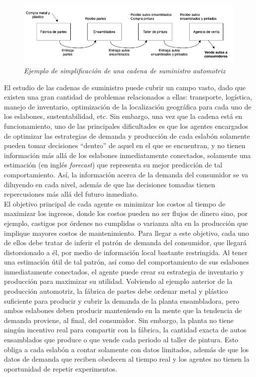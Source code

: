 \begin{figure}[ht]
\caption{\textit{Ejemplo de simplificaci\'on de una cadena de suministro automotriz}}
\label{automotriz}
\includegraphics[width=15cm]{tesis_tex/figs/auto_chain_simple.png}
\centering
\end{figure}


El estudio de las cadenas de suministro puede cubrir un campo vasto, dado que existen una gran cantidad de problemas relacionados a ellas: transporte, log\'istica, manejo de inventario, optimizaci\'on de la localizaci\'on geogr\'afica para cada uno de los eslabones, sustentabilidad, etc. Sin embargo, una vez que la cadena est\'a en funcionamiento, uno de las principales dificultades es que los agentes encargados de optimizar las estrategias de demanda y producci\'on de cada eslab\'on solamente pueden tomar decisiones ``dentro'' de aquel en el que se encuentran, y no tienen informaci\'on m\'as all\'a de los eslabones inmediatamente conectados, solamente una estimaci\'on (en ingl\'es \textit{forecast}) que representa su mejor predicci\'on de tal comportamiento. As\'i, la informaci\'on acerca de la demanda del consumidor se va diluyendo en cada nivel, además de que las decisiones tomadas tienen repercusiones m\'as all\'a del futuro inmediato. \\

El objetivo principal de cada agente es minimizar los costos al tiempo de maximizar los ingresos, donde los costos pueden no ser flujos de dinero sino, por ejemplo, castigos por \'ordenes no cumplidas o varianza alta en la producci\'on que implique mayores costos de mantenimiento. Para llegar a este objetivo, cada uno de ellos debe tratar de inferir el patr\'on de demanda del consumidor, que llegar\'a distorsionado a \'el, por medio de información local bastante restringida. Al tener una estimaci\'on \'util de tal patr\'on, as\'i como del comportamiento de sus eslabones inmediatamente conectados, el agente puede crear su estrategia de inventario y producci\'on para maximizar su utilidad. Volviendo al ejemplo anterior de la producci\'on automotriz, la f\'abrica de partes debe ordenar metal y pl\'astico suficiente para producir y cubrir la demanda de la planta ensambladora, pero ambos eslabones deben producir manteniendo en la mente que la tendencia de demanda proviene, al final, del consumidor. Sin embargo, la planta no tiene ning\'un incentivo real para compartir con la f\'abrica, la cantidad exacta de autos ensamblados que produce o que vende cada periodo al taller de pintura. Esto obliga a cada eslab\'on a contar solamente con datos limitados, adem\'as de que los datos de demanda que reciben obedecen al tiempo real y los agentes no tienen la oportunidad de repetir experimentos.\\

